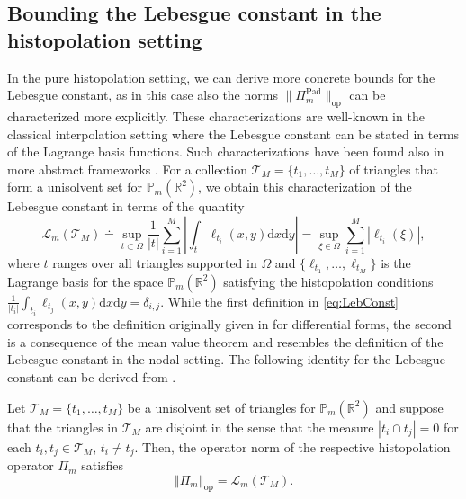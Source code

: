 \documentclass{svjour3}
\newcommand{\de}{\mathrm{d}}
\renewcommand{\P}{\mathbb{P}} %
\renewcommand{\de}{\mathrm{d}} %
\begin{document}
\subsection{Bounding the Lebesgue constant in the histopolation setting}
In the pure histopolation setting, we can derive more concrete bounds for the Lebesgue constant, as in this case also the norms $\|\Pi_m^{\mathrm{Pad}}\|_{\mathrm{op}}$ can be characterized more explicitly. These characterizations are well-known in the classical interpolation setting where the Lebesgue constant can be stated in terms of the Lagrange basis functions. Such characterizations have been found also in more abstract frameworks \cite{ARRLeb}. For a collection $ \mathcal{T}_M = \{ t_1, \ldots, t_M \} $ of triangles that form a unisolvent set for $ \P_m \left(\mathbb{R}^2\right)$, we obtain this characterization of the Lebesgue constant in terms of the quantity
\begin{equation} \label{eq:LebConst}
	\mathscr{L}_m \left(\mathcal{T}_M\right) \doteq \sup_{t \subset \Omega} \frac{1}{|t|} \sum_{i=1}^M \left| \int_t \ell_{t_i}(x,y) \de x \de y \right|  = \sup_{\xi \in \Omega} \sum_{i=1}^M \left| \ell_{t_i}(\xi)\right|, 
\end{equation} 
where $  t $ ranges over all triangles supported in $ \Omega $ and $ \{ \ell_{t_1}, \ldots, \ell_{t_M} \} $ is the Lagrange basis for the space $\mathbb{P}_m(\mathbb{R}^2)$ satisfying the histopolation conditions $ \frac{1}{|t_i|} \int_{t_i} \ell_{t_j}(x,y) \de x \de y = \delta_{i,j} $. While the first definition in \eqref{eq:LebConst} corresponds to the definition originally given in \cite{ARRLeb} for differential forms, the second is a consequence of the mean value theorem and resembles the definition of the Lebesgue constant in the nodal setting. The following identity for the Lebesgue constant can be derived from \cite{BruniElefante}.%


\begin{proposition} \label{prop:intnorm}
Let $\mathcal{T}_M = \{ t_1, \ldots, t_M \} $ be a unisolvent set of triangles for $ \P_m \left(\mathbb{R}^2\right)$ and suppose that the triangles in $\mathcal{T}_M$ are disjoint in the sense that the measure $\left| t_i \cap t_j\right| = 0 $ for each $ t_i,t_j \in \mathcal{T}_M $, $t_i\ne t_j$. Then, the operator norm of the respective histopolation operator $\Pi_m$ satisfies
$$ \left\Vert \Pi_m \right\Vert_{\mathrm{op}} = \mathscr{L}_m \left(\mathcal{T}_M\right). $$
    \end{proposition}
\end{document}
